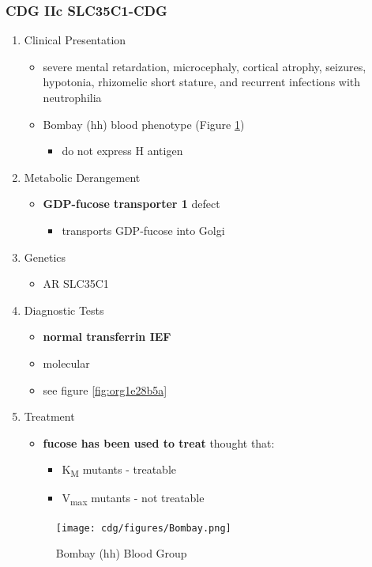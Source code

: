 \documentclass[12pt]{scrartcl}
\begin{document}
\subsubsection{CDG IIc SLC35C1-CDG}
\label{sec:org48e37ee}
\begin{enumerate}
\item Clinical Presentation
\label{sec:org156aa82}
\begin{itemize}
\item severe mental retardation, microcephaly, cortical atrophy, seizures,
hypotonia, rhizomelic short stature, and recurrent infections with
neutrophilia
\item Bombay (hh) blood phenotype (Figure \ref{fig:orgdbf6fd9})
\begin{itemize}
\item do not express H antigen
\end{itemize}
\end{itemize}
\item Metabolic Derangement
\label{sec:org1b897c8}
\begin{itemize}
\item \textbf{GDP-fucose transporter 1} defect
\begin{itemize}
\item transports GDP-fucose into Golgi
\end{itemize}
\end{itemize}
\item Genetics
\label{sec:orgc6100a8}
\begin{itemize}
\item AR SLC35C1
\end{itemize}

\item Diagnostic Tests
\label{sec:orgd422796}
\begin{itemize}
\item \textbf{normal transferrin IEF}
\item molecular
\item see figure \ref{fig:org1e28b5a}
\end{itemize}
\item Treatment
\label{sec:org0c57c21}
\begin{itemize}
\item \textbf{fucose has been used to treat} thought that:
\begin{itemize}
\item K\textsubscript{M} mutants - treatable
\item V\textsubscript{max} mutants - not treatable
\end{itemize}
\end{itemize}

\begin{figure}[htbp]
\centering
\texttt{[image: cdg/figures/Bombay.png]}
\caption[Hh]{\label{fig:orgdbf6fd9}Bombay (hh) Blood Group}
\end{figure}
\end{enumerate}
\end{document}
